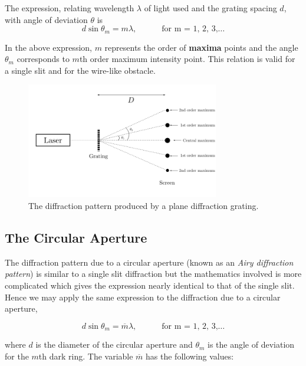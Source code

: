The expression, relating wavelength $\lambda$ of light used and the grating spacing $d$, with angle of deviation $\theta$ is
\begin{equation*}
    d \sin{\theta_m} = m \lambda,  \quad\quad\quad \text{for    m  = 1, 2, 3,}\hdots
\end{equation*}

In the above expression, $m$ represents the order of \textbf{maxima} points and the angle $\theta_m$  corresponds to  $m$th  order maximum intensity point. This relation is valid for a single slit and for the wire-like obstacle.

\begin{figure}[!htb]
    \centering
    \includegraphics[width=0.75\textwidth]{figs/grating.png}
    \caption{The diffraction pattern produced by a plane diffraction grating.}
    \label{fig:grating}
\end{figure}


\subsection*{The Circular Aperture}

The diffraction pattern due to a circular aperture (known as an \textit{Airy diffraction pattern}) is similar to a single slit diffraction but the mathematics involved is more complicated which gives the expression nearly identical to that of the single slit. Hence we may apply the same expression to the diffraction due to a circular aperture, 

\begin{equation*}
    d \sin{\theta_m} = \overline{m} \lambda,  \quad\quad\quad \text{for    m  = 1, 2, 3,}\hdots
\end{equation*}

where $d$ is the diameter of the circular aperture and $\theta_m$ is the angle of deviation for the $m$th dark ring. The variable $\overline{m}$ has the following values:

